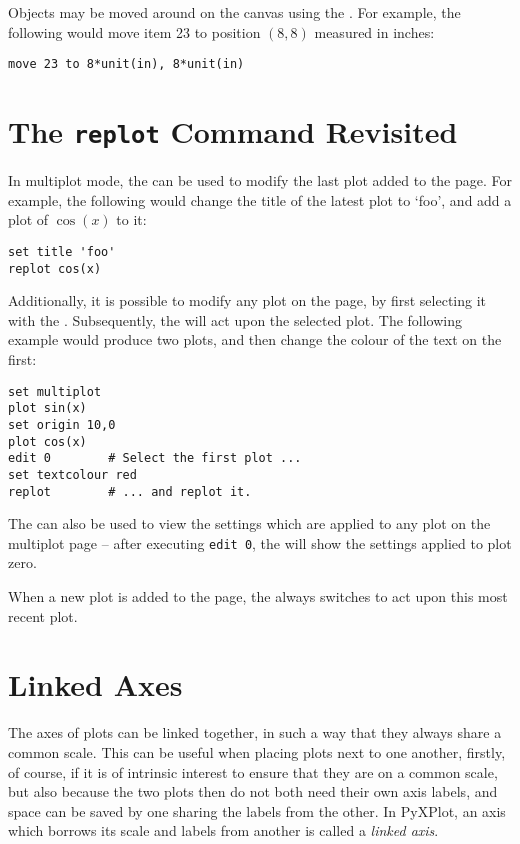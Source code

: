 Objects may be moved around on the canvas using the . For
example, the following would move item 23 to position $(8,8)$ measured in
inches:
\begin{verbatim} 
move 23 to 8*unit(in), 8*unit(in)
\end{verbatim}

\section{The {\tt replot} Command Revisited}

In multiplot mode, the  can be used to modify the last plot
added to the page. For example, the following would change the title of the
latest plot to `foo', and add a plot of $\cos(x)$ to it:

\begin{verbatim} 
set title 'foo'
replot cos(x)
\end{verbatim}

Additionally, it is possible to modify any plot on the page, by first selecting
it with the . Subsequently, the  will act upon
the selected plot. The following example would produce two plots, and then
change the colour of the text on the first:

\begin{verbatim} 
set multiplot
plot sin(x)
set origin 10,0
plot cos(x)
edit 0        # Select the first plot ...
set textcolour red
replot        # ... and replot it.
\end{verbatim}

The  can also be used to view the settings which are applied to
any plot on the multiplot page -- after executing {\tt edit~0}, the
 will show the settings applied to plot zero.

When a new plot is added to the page, the  always switches to
act upon this most recent plot.

\section{Linked Axes}

The axes of plots can be linked together, in such a way that they always share
a common scale. This can be useful when placing plots next to one another,
firstly, of course, if it is of intrinsic interest to ensure that they are on a
common scale, but also because the two plots then do not both need their own
axis labels, and space can be saved by one sharing the labels from the other.
In PyXPlot, an axis which borrows its scale and labels from another is called a
{\it linked axis}.

